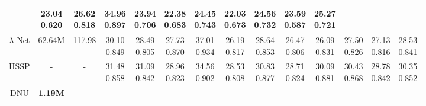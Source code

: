 \documentclass{article}
\begin{document}
\begin{table*}[t]
{\begin{tabular}{cccccccccccccc}
			&\tabincell{c}{23.04\\0.620}
			&\tabincell{c}{26.62\\0.818}
			&\tabincell{c}{34.96\\0.897}
			&\tabincell{c}{23.94\\0.706}
			&\tabincell{c}{22.38\\0.683}
			&\tabincell{c}{24.45\\0.743}
			&\tabincell{c}{22.03\\0.673}
			&\tabincell{c}{24.56\\0.732}
			&\tabincell{c}{23.59\\0.587}
			&\tabincell{c}{25.27\\0.721}
			\\
			\midrule
			$\lambda$-Net \cite{lambda}
			& 62.64M
			& 117.98
			&\tabincell{c}{30.10\\0.849}
			&\tabincell{c}{28.49\\0.805}
			&\tabincell{c}{27.73\\0.870}
			&\tabincell{c}{37.01\\0.934}
			&\tabincell{c}{26.19\\0.817}
			&\tabincell{c}{28.64\\0.853}
			&\tabincell{c}{26.47\\0.806}
			&\tabincell{c}{26.09\\0.831}
			&\tabincell{c}{27.50\\0.826}
			&\tabincell{c}{27.13\\0.816}
			&\tabincell{c}{28.53\\0.841}
			\\
			\midrule
			HSSP \cite{hssp}
			& - 
			& -
			&\tabincell{c}{31.48\\0.858}
			&\tabincell{c}{31.09\\0.842}
			&\tabincell{c}{28.96\\0.823}
			&\tabincell{c}{34.56\\0.902}
			&\tabincell{c}{28.53\\0.808}
			&\tabincell{c}{30.83\\0.877}
			&\tabincell{c}{28.71\\0.824}
			&\tabincell{c}{30.09\\0.881}
			&\tabincell{c}{30.43\\0.868}
			&\tabincell{c}{28.78\\0.842}
			&\tabincell{c}{30.35\\0.852}
			\\
			\midrule
			DNU \cite{dnu}
			& \bf 1.19M

\end{tabular}}
\end{table*}
\end{document}
